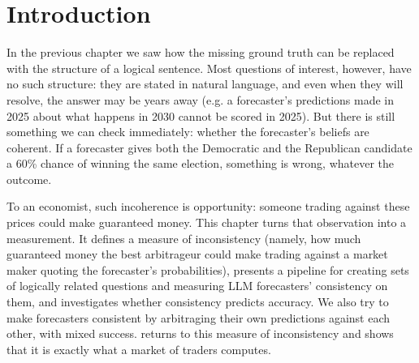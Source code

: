 
\section{Introduction}\label{cfc:sec:intro}

\begin{draftblock}
In the previous chapter we saw how the missing ground truth can be replaced with the structure of a logical sentence. Most questions of interest, however, have no such structure: they are stated in natural language, and even when they will resolve, the answer may be years away (e.g. a forecaster's predictions made in 2025 about what happens in 2030 cannot be scored in 2025). But there is still something we can check immediately: whether the forecaster's beliefs are coherent. If a forecaster gives both the Democratic and the Republican candidate a 60\% chance of winning the same election, something is wrong, whatever the outcome.

To an economist, such incoherence is opportunity: someone trading against these prices could make guaranteed money. This chapter turns that observation into a measurement. It defines a measure of inconsistency (namely, how much guaranteed money the best arbitrageur could make trading against a market maker quoting the forecaster's probabilities), presents a pipeline for creating sets of logically related questions and measuring LLM forecasters' consistency on them, and investigates whether consistency predicts accuracy. We also try to make forecasters consistent by arbitraging their own predictions against each other, with mixed success.  returns to this measure of inconsistency and shows that it is exactly what a market of traders computes.
\end{draftblock}


